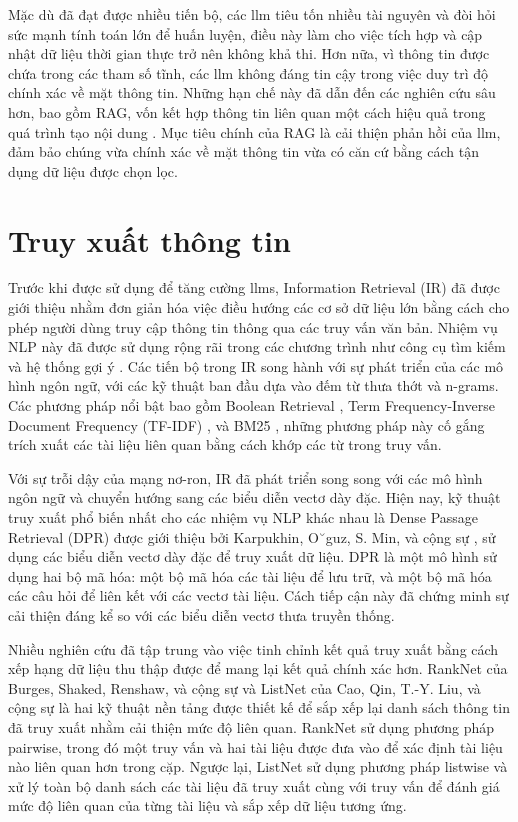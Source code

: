 Mặc dù đã đạt được nhiều tiến bộ, các \gls{llm} tiêu tốn nhiều tài nguyên và đòi hỏi sức mạnh tính toán lớn để huấn luyện, điều này làm cho việc tích hợp và cập nhật dữ liệu thời gian thực trở nên không khả thi. Hơn nữa, vì thông tin được chứa trong các tham số tĩnh, các \gls{llm} không đáng tin cậy trong việc duy trì độ chính xác về mặt thông tin. Những hạn chế này đã dẫn đến các nghiên cứu sâu hơn, bao gồm RAG, vốn kết hợp thông tin liên quan một cách hiệu quả trong quá trình tạo nội dung \cite{gao2023retrievalaugmented}. Mục tiêu chính của RAG là cải thiện phản hồi của \gls{llm}, đảm bảo chúng vừa chính xác về mặt thông tin vừa có căn cứ bằng cách tận dụng dữ liệu được chọn lọc.

\section{Truy xuất thông tin}
\label{section:information_retrieval}

Trước khi được sử dụng để tăng cường \gls{llm}s, Information Retrieval (IR) đã được giới thiệu nhằm đơn giản hóa việc điều hướng các cơ sở dữ liệu lớn bằng cách cho phép người dùng truy cập thông tin thông qua các truy vấn văn bản. Nhiệm vụ NLP này đã được sử dụng rộng rãi trong các chương trình như công cụ tìm kiếm và hệ thống gợi ý \cite{li2024matching}. Các tiến bộ trong IR song hành với sự phát triển của các mô hình ngôn ngữ, với các kỹ thuật ban đầu dựa vào đếm từ thưa thớt và n-grams. Các phương pháp nổi bật bao gồm Boolean Retrieval \cite{salton1983extended}, Term Frequency-Inverse Document Frequency (TF-IDF) \cite{luhn1957statistical}, và BM25 \cite{robertson2009probabilistic}, những phương pháp này cố gắng trích xuất các tài liệu liên quan bằng cách khớp các từ trong truy vấn.

Với sự trỗi dậy của mạng nơ-ron, IR đã phát triển song song với các mô hình ngôn ngữ và chuyển hướng sang các biểu diễn vectơ dày đặc. Hiện nay, kỹ thuật truy xuất phổ biến nhất cho các nhiệm vụ NLP khác nhau là Dense Passage Retrieval (DPR) được giới thiệu bởi Karpukhin, O˘guz, S. Min, và cộng sự \cite{karpukhin2020dense}, sử dụng các biểu diễn vectơ dày đặc để truy xuất dữ liệu. DPR là một mô hình sử dụng hai bộ mã hóa: một bộ mã hóa các tài liệu để lưu trữ, và một bộ mã hóa các câu hỏi để liên kết với các vectơ tài liệu. Cách tiếp cận này đã chứng minh sự cải thiện đáng kể so với các biểu diễn vectơ thưa truyền thống.

Nhiều nghiên cứu đã tập trung vào việc tinh chỉnh kết quả truy xuất bằng cách xếp hạng dữ liệu thu thập được để mang lại kết quả chính xác hơn. RankNet của Burges, Shaked, Renshaw, và cộng sự \cite{burges2005learning} và ListNet của Cao, Qin, T.-Y. Liu, và cộng sự \cite{cao2007learning} là hai kỹ thuật nền tảng được thiết kế để sắp xếp lại danh sách thông tin đã truy xuất nhằm cải thiện mức độ liên quan. RankNet sử dụng phương pháp pairwise, trong đó một truy vấn và hai tài liệu được đưa vào để xác định tài liệu nào liên quan hơn trong cặp. Ngược lại, ListNet sử dụng phương pháp listwise và xử lý toàn bộ danh sách các tài liệu đã truy xuất cùng với truy vấn để đánh giá mức độ liên quan của từng tài liệu và sắp xếp dữ liệu tương ứng.

